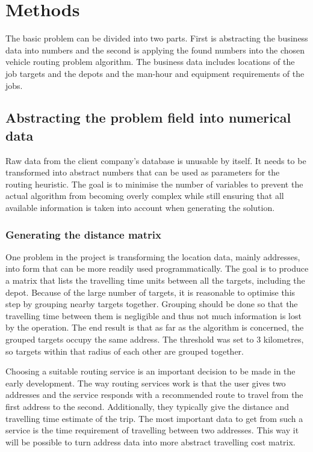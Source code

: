 \chapter{Methods}
\label{chapter:methods}

The basic problem can be divided into two parts. First is abstracting the business data into numbers and the second is applying the found numbers into the chosen vehicle routing problem algorithm. The business data includes locations of the job targets and the depots and the man-hour and equipment requirements of the jobs.  

\section{Abstracting the problem field into numerical data}

Raw data from the client company's database is unusable by itself. It needs to be transformed into abstract numbers that can be used as parameters for the routing heuristic. The goal is to minimise the number of variables to prevent the actual algorithm from becoming overly complex while still ensuring that all available information is taken into account when generating the solution. 

\subsection{Generating the distance matrix}

One problem in the project is transforming the location data, mainly addresses, into form that can be more readily used programmatically. The goal is to produce a matrix that lists the travelling time units between all the targets, including the depot. Because of the large number of targets, it is reasonable to optimise this step by grouping nearby targets together. Grouping should be done so that the travelling time between them is negligible and thus not much information is lost by the operation. The end result is that as far as the algorithm is concerned, the grouped targets occupy the same address. The threshold was set to 3 kilometres, so targets within that radius of each other are grouped together.

Choosing a suitable routing service is an important decision to be made in the early development. The way routing services work is that the user gives two addresses and the service responds with a recommended route to travel from the first address to the second. Additionally, they typically give the distance and travelling time estimate of the trip. The most important data to get from such a service is the time requirement of travelling between two addresses. This way it will be possible to turn address data into more abstract travelling cost matrix.

